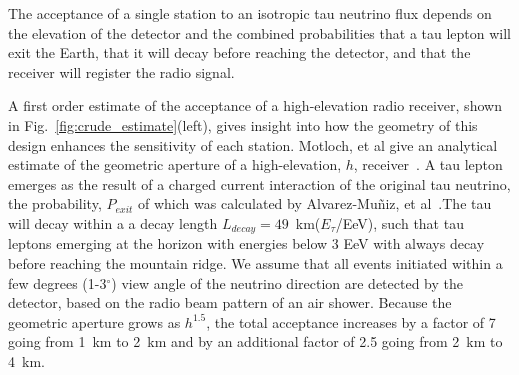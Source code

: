 \documentclass[12pt]{article}
\begin{document}
The acceptance of a single station to an isotropic tau neutrino flux depends on the elevation of the detector and the combined probabilities that a tau lepton will exit the Earth, that it will decay before reaching the detector, and that the receiver will register the radio signal. 

A first order estimate of the acceptance of a high-elevation radio receiver, shown in Fig.~\ref{fig:crude_estimate}(left), gives insight into how the geometry of this design enhances the sensitivity of each station. Motloch, et al give an analytical estimate of the geometric aperture of a high-elevation, $h$, receiver~\cite{Motloch2014}. 
A tau lepton emerges as the result of a charged current interaction of the original tau neutrino, the probability, $P_{exit}$ of which was calculated by  Alvarez-Mu\~niz, et al~\cite{Alvarez-Muniz2018}.The tau will decay within a a decay length $L_{decay} = 49$~km($E_{\tau}$/EeV), such that tau leptons emerging at the horizon with energies below 3 EeV with always decay before reaching the mountain ridge. We assume that all events initiated within a few degrees (1-3$^{\circ}$) view angle of the neutrino direction are detected by the detector, based on the radio beam pattern of an air shower. Because the geometric aperture grows as $h^{1.5}$, the total acceptance increases by a factor of 7 going from 1~km to 2~km and by an additional factor of 2.5 going from 2~km to 4~km. 

\end{document}
